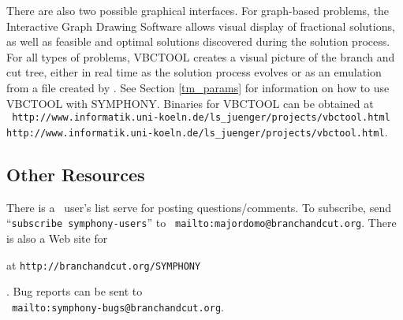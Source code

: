 There are also two possible graphical interfaces. For graph-based
problems, the Interactive Graph Drawing Software allows visual display
of fractional solutions, as well as feasible and optimal solutions
discovered during the solution process. For all types of problems,
VBCTOOL creates a visual picture of the branch and cut tree, either
in real time as the solution process evolves or as an emulation from a
file created by
\BB. See Section \ref{tm_params} for information on how to use VBCTOOL
with SYMPHONY. Binaries for VBCTOOL can be obtained at \\ 
{\tt \htmladdnormallink
{http://www.informatik.uni-koeln.de/ls\_juenger/projects/vbctool.html}
{http://www.informatik.uni-koeln.de/ls\_juenger/projects/vbctool.html}}.


\subsection{Other Resources}
\label{resources}
There is a \BB\ user's list serve for posting questions/comments.
To subscribe, send ``{\tt subscribe symphony-users}'' to
{\tt {}
{mailto:majordomo@branchandcut.org}}. There is also a Web site for
\begin{latexonly}
at {\tt http://branchandcut.org/SYMPHONY}
\end{latexonly}.  
Bug reports can be sent to \\
{\tt {}
{mailto:symphony-bugs@branchandcut.org}}.


